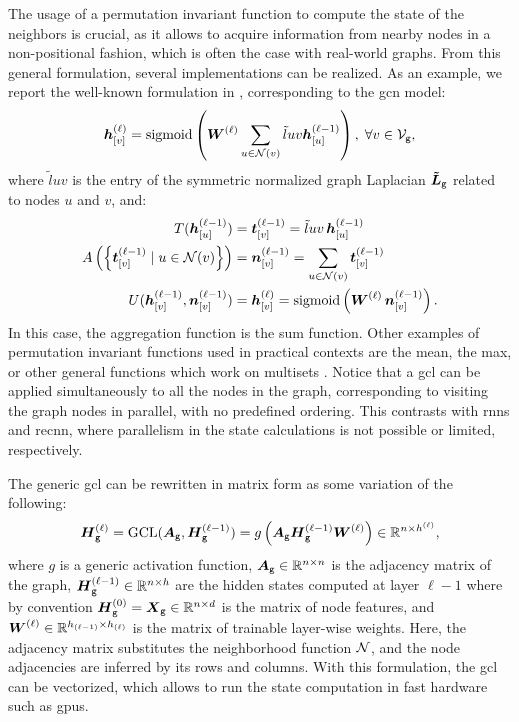 The usage of a permutation invariant function to compute the state of the neighbors is crucial, as it allows to acquire information from nearby nodes in a non-positional fashion, which is often the case with real-world graphs. From this general formulation, several implementations can be realized. As an example, we report the well-known formulation in \citep{kipf2017semisupervisedgcn}, corresponding to the \gls{gcn} model:
\begin{align}
    \label{eq:convolutional}
    \StateVector{v}{\ell} = \sigmoid\Par{ \LayerMatrix{w}{\ell} \sum_{u \in \Neigh(v)} \tilde{l}{uv}\StateVector{u}{\ell-1}}, \; \forall v \in \Nodes{g},
\end{align}
where $\tilde{l}{uv}$ is the entry of the symmetric normalized graph Laplacian $\NormLaplacianMatrix{g}$ related to nodes $u$ and $v$, and:
\begin{align}
    \label{eq:transform}
    T(\StateVector{u}{\ell-1}) &= \GenStateVector{t}{v}{\ell-1}  = \tilde{l}{uv}\,\StateVector{u}{\ell-1}\\
    \label{eq:aggregate}
    A\Par{\Set{\GenStateVector{t}{v}{\ell-1} \mid u \in \Neigh(v)}} &= \GenStateVector{n}{v}{\ell-1} = \sum_{u \in \Neigh(v)} \GenStateVector{t}{v}{\ell-1}\\
    \label{eq:update}
    U(\StateVector{v}{\ell-1}, \GenStateVector{n}{v}{\ell-1}) &= \StateVector{v}{\ell} =  \sigmoid\Par{\LayerMatrix{w}{\ell}\, \GenStateVector{n}{v}{\ell-1}}.
\end{align}
In this case, the aggregation function is the sum function. Other examples of permutation invariant functions used in practical contexts are the mean, the max, or other general functions which work on multisets \citep{zaheer2017deepsets}. Notice that a \gls{gcl} can be applied simultaneously to all the nodes in the graph, corresponding to visiting the graph nodes in parallel, with no predefined ordering. This contrasts with \glspl{rnn} and \gls{recnn}, where parallelism in the state calculations is not possible or limited, respectively.

The generic \gls{gcl} can be rewritten in matrix form as some variation of the following:
$$\LayerStateMat{g}{\ell} = \Fun{GCL}(\AdjMatrix{g}, \LayerStateMat{g}{\ell-1}) = g\Par{\AdjMatrix{g}\LayerStateMat{g}{\ell-1}\LayerMatrix{w}{\ell}} \in \Real^{n \times h^{(\ell)}},$$
where $g$ is a generic activation function, $\AdjMatrix{g} \in \Real^{n \times n}$ is the adjacency matrix of the graph, $\LayerStateMat{g}{\ell-1} \in \Real^{n \times h}$ are the hidden states computed at layer $\ell-1$ where by convention $\LayerStateMat{g}{0} = \FeatureMatrix{g} \in \Real^{n \times d}$ is the matrix of node features, and $\LayerMatrix{w}{\ell} \in \Real^{h_{(\ell-1)} \times h_{(\ell)}}$ is the matrix of trainable layer-wise weights. Here, the adjacency matrix substitutes the neighborhood function $\Neigh$, and the node adjacencies are inferred by its rows and columns. With this formulation, the \gls{gcl} can be vectorized, which allows to run the state computation in fast hardware such as \glspl{gpu}.

